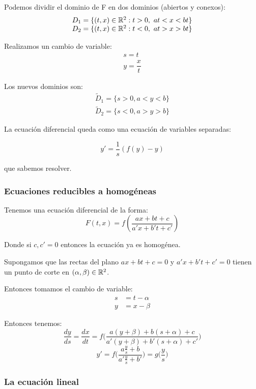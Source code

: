 Podemos dividir el dominio de F en dos dominios (abiertos y conexos):\\
\[
\begin{array}{l}
  D_1 = \{(t,x) \in \mathbb{R} ^2 : t > 0, \ at < x < bt\}\\
  D_2 = \{(t,x) \in \mathbb{R} ^2 : t < 0, \ at > x > bt\}
\end{array}
\]

Realizamos un cambio de variable:
\[
\begin{array}{l}
  s = t\\
  y = \dfrac{x}{t}
\end{array}
\]

Los nuevos dominios son:
\[
\begin{array}{l}
  \tilde{D}_1 = \{s > 0, a < y < b\}\\
  \tilde{D}_2 = \{s < 0, a > y > b\}
\end{array}
\]

La ecuación diferencial queda como una ecuación de variables separadas:

$$y' = \frac{1}{s}\left(f(y) - y\right)$$

que sabemos resolver.

\subsubsection{Ecuaciones reducibles a homogéneas}

Tenemos una ecuación diferencial de la forma: 
\[
F(t,x) = f\left( \frac{ax+bt+c}{a'x+b't+c'} \right)
\]

Donde si $c,c' = 0$ entonces la ecuación ya es homogénea.

Supongamos que las rectas del plano $ax + bt+c=0$ y $a'x+b't+c'=0$ tienen un punto de corte en $(\alpha, \beta ) \in \mathbb{R}^2$.

Entonces tomamos el cambio de variable:
\begin{align*}
s &= t-\alpha \\
y &= x - \beta
\end{align*}


Entonces tenemos: 
\[
\frac{dy}{ds} = \frac{dx}{dt} = f\Big( \frac{a(y+\beta ) + b (s+\alpha ) + c}{a'(y+\beta ) + b'(s+ \alpha ) + c'} \Big)
\]
\[
y' = f \bigg( \frac{a \frac{y}{s} + b}{a'\frac{y}{s} + b'} \bigg) = g\Big( \frac{y}{s}\Big)
\]

\subsubsection{La ecuación lineal}

